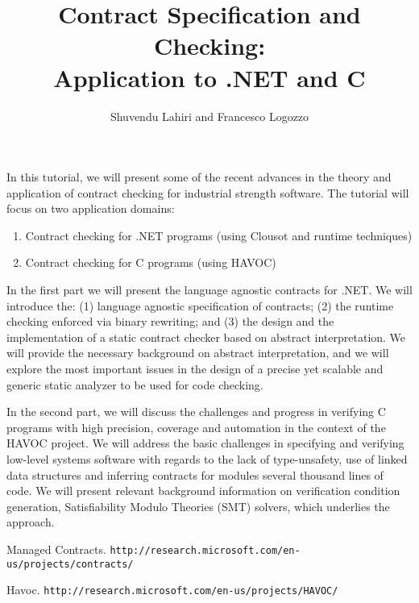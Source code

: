 \documentclass{llncs}
\title{Contract Specification and Checking: \\ Application to .NET and C}
\author{Shuvendu Lahiri and Francesco Logozzo}
\institute{
RiSE, Microsoft Research\\
 Redmond, WA (USA) \\
\email{\{shuvendu, logozzo\}@microsoft.com} \\
\texttt{http://research.microsoft.com/\textasciitilde \{shuvendu, logozzo\}}
}
\begin{document}
\maketitle

In this tutorial, we will present some of the recent advances in the theory and application of contract checking for industrial strength software. The tutorial will focus on two application domains: 

\begin{enumerate}
 \item Contract checking for .NET programs (using Clousot and runtime techniques) 
 \item Contract checking for C programs (using HAVOC)
\end{enumerate}

In the first part we will present the language agnostic contracts for .NET. We will introduce the: (1) language agnostic specification of contracts; (2) the runtime checking enforced via binary rewriting; and (3) the design and the implementation of a static contract checker based on abstract interpretation. We will provide the necessary background on abstract interpretation, and we will explore the most important issues in the design of a precise yet scalable and generic static analyzer to be used for code checking.

In the second part, we will discuss the challenges and progress in verifying C programs with high precision, coverage and automation in the context of the HAVOC project. We will address the basic challenges in specifying and verifying low-level systems software with regards to the lack of type-unsafety, use of linked data structures and inferring
contracts for modules several thousand lines of code. We will present relevant background information on verification condition generation,  Satisfiability Modulo Theories (SMT) solvers,  which underlies the approach.



\begin{thebibliography}{10}
\small

\newblock Managed Contracts.
\newblock \texttt{http://research.microsoft.com/en-us/projects/contracts/}

\newblock Havoc.
\newblock \texttt{http://research.microsoft.com/en-us/projects/HAVOC/}

\end{thebibliography}
\end{document}
